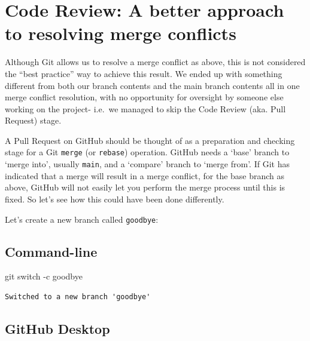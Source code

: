 \documentclass[
  letterpaper,
  DIV=11,
  numbers=noendperiod]{scrartcl}
\newenvironment{Shaded}{\begin{snugshade}}{\end{snugshade}}
\newcommand{\AttributeTok}[1]{\textcolor[rgb]{0.40,0.45,0.13}{#1}}
\newcommand{\FunctionTok}[1]{\textcolor[rgb]{0.28,0.35,0.67}{#1}}
\newcommand{\NormalTok}[1]{\textcolor[rgb]{0.00,0.23,0.31}{#1}}
\begin{document}
\section{Code Review: A better approach to resolving merge
conflicts}\label{code-review-a-better-approach-to-resolving-merge-conflicts}

Although Git allows us to resolve a merge conflict as above, this is not
considered the ``best practice'' way to achieve this result. We ended up
with something different from both our branch contents and the main
branch contents all in one merge conflict resolution, with no
opportunity for oversight by someone else working on the project-
i.e.~we managed to skip the Code Review (aka. Pull Request) stage.

A Pull Request on GitHub should be thought of as a preparation and
checking stage for a Git \texttt{merge} (or \texttt{rebase}) operation.
GitHub needs a `base' branch to `merge into', usually \texttt{main}, and
a `compare' branch to `merge from'. If Git has indicated that a merge
will result in a merge conflict, for the base branch as above, GitHub
will not easily let you perform the merge process until this is fixed.
So let's see how this could have been done differently.

Let's create a new branch called \texttt{goodbye}:

\subsection{Command-line}

\begin{Shaded}
\begin{Highlighting}[]
\FunctionTok{git}\NormalTok{ switch }\AttributeTok{{-}c}\NormalTok{ goodbye}
\end{Highlighting}
\end{Shaded}

\begin{verbatim}
Switched to a new branch 'goodbye'
\end{verbatim}

\subsection{GitHub Desktop}
\end{document}
